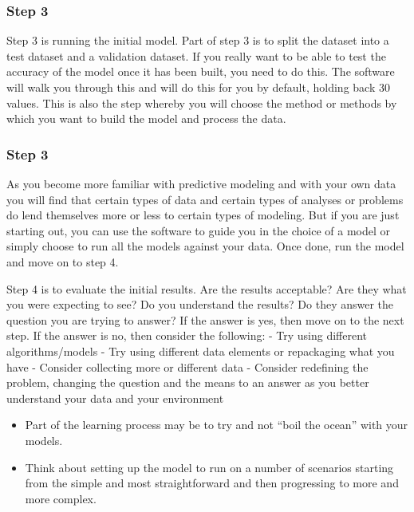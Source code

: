 \documentclass[PredictiveAnalytics101.tex]{subfiles}
\begin{document}
\begin{frame}
	\frametitle{Step 3}
Step 3 is running the initial model. Part of step 3 is to split the dataset into a test dataset and a
validation dataset. If you really want to be able to test the accuracy of the model once it has been built,
you need to do this. The software will walk you through this and will do this for you by default, holding
back 30%
values. This is also the step whereby you will choose the method or methods by which you want to
build the model and process the data. 
\end{frame}
\begin{frame}
	\frametitle{Step 3}
As you become more familiar with predictive modeling and with
your own data you will find that certain types of data and certain types of analyses or problems do lend
themselves more or less to certain types of modeling. But if you are just starting out, you can use the
software to guide you in the choice of a model or simply choose to run all the models against your data.
Once done, run the model and move on to step 4.
\end{frame}
\begin{frame}
Step 4 is to evaluate the initial results. Are the results acceptable? Are they what you were expecting
to see? Do you understand the results? Do they answer the question you are trying to answer? If the
answer is yes, then move on to the next step. If the answer is no, then consider the following:
- Try using different algorithms/models
- Try using different data elements or repackaging what you have
- Consider collecting more or different data
- Consider redefining the problem, changing the question and the means to an answer as you
better understand your data and your environment
\end{frame}
\begin{frame}
\begin{itemize}
\item Part of the learning process may be to try and not “boil the ocean” with your models.
\item Think about
setting up the model to run on a number of scenarios starting from the simple and most straightforward
and then progressing to more and more complex.
\end{itemize}

\end{frame}
\end{document}
